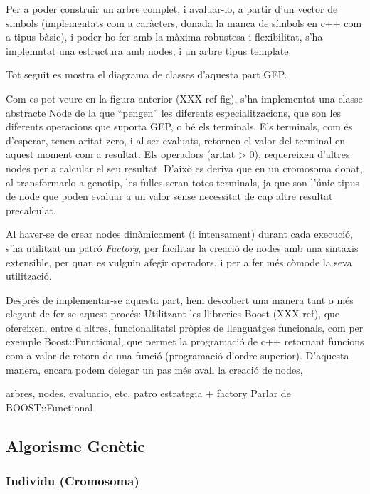 \documentclass[titlepage,a4paper,12pt]{book}
\begin{document}
Per a poder construir un arbre complet, i avaluar-lo, a partir d'un vector de
simbols (implementats com a caràcters, donada la manca de símbols en c++ com a
tipus bàsic), i poder-ho fer amb la màxima robustesa i flexibilitat, s'ha
implemntat una estructura amb nodes, i un arbre tipus template.

Tot seguit es mostra el diagrama de classes d'aquesta part GEP.


Com es pot veure en la figura anterior (XXX ref fig), s'ha implementat una
classe abstracte Node de la que ``pengen'' les diferents especialitzacions, que
son les diferents operacions que suporta GEP, o bé els terminals. Els terminals,
com és d'esperar, tenen aritat zero, i al ser evaluats, retornen el valor del
terminal en aquest moment com a resultat.  Els operadors (aritat > 0),
requereixen d'altres nodes per a calcular el seu resultat.  D'això es deriva que
en un cromosoma donat, al transformarlo a genotip, les fulles seran totes
terminals, ja que son l'únic tipus de node que poden evaluar a un valor sense
necessitat de cap altre resultat precalculat.

Al haver-se de crear nodes dinàmicament (i intensament) durant cada execució,
s'ha utilitzat un patró \emph{Factory}, per facilitar la creació de nodes amb
una sintaxis extensible, per quan es vulguin afegir operadors, i per a fer més
còmode la seva utilització.

Després de implementar-se aquesta part, hem descobert una manera tant o més
elegant de fer-se aquest procés:  Utilitzant les llibreries Boost (XXX ref), que
ofereixen, entre d'altres, funcionalitatsl pròpies de llenguatges funcionals,
com per exemple Boost::Functional, que permet la programació de c++ retornant
funcions com a valor de retorn de una funció (programació d'ordre superior).  
D'aquesta manera, encara podem delegar un pas més avall la creació de nodes, 

arbres, nodes, evaluacio, etc.
patro estrategia + factory
Parlar de BOOST::Functional

\subsection{Algorisme Genètic} %
\label{ssec:GAlgorisme Genetic}

\subsubsection{Individu (Cromosoma)} %
\label{ssub:Individu (Cromosoma}
\end{document}
